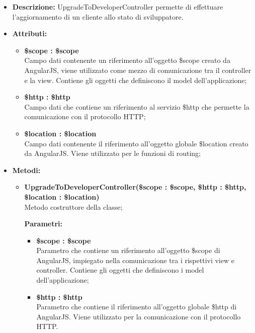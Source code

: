 \begin{itemize}
	\item \textbf{Descrizione:} UpgradeToDeveloperController permette di effettuare l'aggiornamento di un cliente allo stato di sviluppatore.
	\item \textbf{Attributi:}
	\begin{itemize}
		
		\item \textbf{\$scope : \$scope}\\
		Campo dati contenente un riferimento all'oggetto \$scope creato da AngularJS, viene utilizzato come mezzo di comunicazione tra il controller e la view. Contiene gli oggetti che definiscono il model dell'applicazione;
		
		\item \textbf{\$http : \$http }\\
		Campo dati che contiene un riferimento al servizio \$http che permette la comunicazione con il protocollo HTTP;
		
		\item \textbf{\$location : \$location }\\
		Campo dati contenente il riferimento all'oggetto globale \$location creato da AngularJS. Viene utilizzato per le funzioni di routing;
		
		
	\end{itemize}
	\item \textbf{Metodi:}
	\begin{itemize}
		
		\item \textbf{UpgradeToDeveloperController(\$scope : \$scope, \$http : \$http, \$location : \$location)}\\
		Metodo costruttore della classe;
		\begin{description}
			\item[\textbf{Parametri:}]
		\end{description}
		\begin{itemize}
			\item \textbf{\$scope : \$scope}\\
			Parametro che contiene un riferimento all'oggetto \$scope di AngularJS, impiegato nella comunicazione tra i rispettivi view e controller. Contiene gli oggetti che definiscono i model dell'applicazione;
			
			\item \textbf{\$http : \$http}\\
			Parametro che contiene il riferimento all'oggetto globale \$http di AngularJS. Viene utilizzato per la comunicazione con il protocollo HTTP.
			

\end{itemize}
\end{itemize}
\end{itemize}
